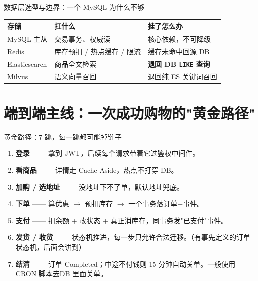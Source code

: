 \documentclass[aspectratio=169,11pt]{beamer}
\begin{document}
\begin{frame}[shrink]{数据层选型与边界：一个 MySQL 为什么不够}
  \vspace{0.2em}
  \begin{table}
  \centering\small
  \begin{tabular}{@{}lll@{}}
  \toprule
  \textbf{存储} & \textbf{扛什么} & \textbf{挂了怎么办} \\
  \midrule
  MySQL 主从     & 交易事务、权威读             & 核心依赖，不可降级 \\
  Redis          & 库存预扣 / 热点缓存 / 限流     & 缓存未命中回源 DB \\
  Elasticsearch  & 商品全文检索                 & \textbf{退回 DB \texttt{LIKE} 查询} \\
  Milvus         & 语义向量召回                 & 退回纯 ES 关键词召回 \\
  \bottomrule
  \end{tabular}
  \end{table}
  \vspace{0.2em}

\end{frame}

\section{端到端主线：一次成功购物的"黄金路径"}

\begin{frame}[shrink]{黄金路径：7 跳，每一跳都可能掉链子}
\begin{enumerate}
  \item \textbf{登录} —— 拿到 JWT，后续每个请求带着它过鉴权中间件。
  \item \textbf{看商品} —— 详情走 Cache Aside，热点不打穿 DB。
  \item \textbf{加购 / 选地址} —— 没地址下不了单，默认地址兜底。
  \item \textbf{下单} —— 算优惠 $\to$ 预扣库存 $\to$ 一个事务落订单+事件。
  \item \textbf{支付} —— 扣余额 + 改状态 + 真正消库存，同事务发"已支付"事件。
  \item \textbf{发货 / 收货} —— 状态机推进，每一步只允许合法迁移。（有事先定义的订单状态机，后面会讲到）
  \item \textbf{结清} —— 订单 Completed；中途不付钱则 15 分钟自动关单。一般使用CRON 脚本去DB 里面关单。
\end{enumerate}
\vspace{1mm}
\end{frame}
\end{document}
